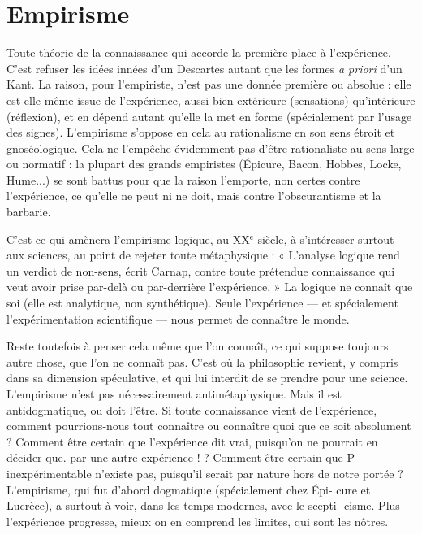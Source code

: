 \section{Empirisme}
Toute théorie de la connaissance qui accorde la première place
à l’expérience. C’est refuser les idées innées d’un Descartes
autant que les formes {\it a priori} d’un Kant. La raison, pour l’empiriste, n'est pas
une donnée première ou absolue : elle est elle-même issue de l'expérience, aussi
bien extérieure (sensations) qu’intérieure (réflexion), et en dépend autant
qu’elle la met en forme (spécialement par l’usage des signes). L'empirisme
s'oppose en cela au rationalisme en son sens étroit et gnoséologique. Cela ne
l'empêche évidemment pas d’être rationaliste au sens large ou normatif : la plupart
des grands empiristes (Épicure, Bacon, Hobbes, Locke, Hume...) se sont
battus pour que la raison l’emporte, non certes contre l’expérience, ce qu’elle ne
peut ni ne doit, mais contre l’obscurantisme et la barbarie.

C’est ce qui amènera l’empirisme logique, au {\footnotesize XX$^\text{e}$} siècle, à s'intéresser surtout
aux sciences, au point de rejeter toute métaphysique : « L'analyse logique
rend un verdict de non-sens, écrit Carnap, contre toute prétendue connaissance
qui veut avoir prise par-delà ou par-derrière l’expérience. » La logique ne
connaît que soi (elle est analytique, non synthétique). Seule l'expérience — et
spécialement l’expérimentation scientifique — nous permet de connaître le
monde.

Reste toutefois à penser cela même que l’on connaît, ce qui suppose toujours
autre chose, que l’on ne connaît pas. C’est où la philosophie revient, y
compris dans sa dimension spéculative, et qui lui interdit de se prendre pour
une science. L’empirisme n’est pas nécessairement antimétaphysique. Mais il
est antidogmatique, ou doit l'être. Si toute connaissance vient de l’expérience,
comment pourrions-nous tout connaître ou connaître quoi que ce soit
absolument ? Comment être certain que l'expérience dit vrai, puisqu'on ne
pourrait en décider que. par une autre expérience ! ? Comment être certain que
P inexpérimentable n'existe pas, puisqu'il serait par nature hors de notre
portée ? L’empirisme, qui fut d’abord dogmatique (spécialement chez Épi-
cure et Lucrèce), a surtout à voir, dans les temps modernes, avec le scepti-
cisme. Plus l’expérience progresse, mieux on en comprend les limites, qui
sont les nôtres.

